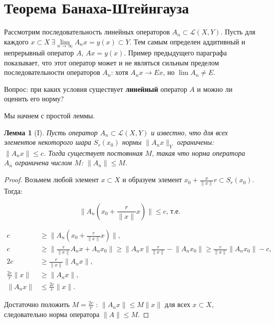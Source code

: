 \documentclass[12pt,a4paper,titlepage,oneside]{book}
\theoremstyle{definition}
\theoremstyle{plain}
\theoremstyle{break}
\theoremstyle{remark}
\theoremstyle{remark}
\theoremstyle{remark}
\theoremstyle{remark}
\theoremstyle{plain}
\newtheorem*{lemma}{Лемма}
\theoremstyle{plain}
\begin{document}
\section{Теорема Банаха-Штейнгауза}
Рассмотрим последовательность линейных операторов $A_n \subset \mathcal{L}(X,Y)$. Пусть для каждого $x \subset X\ \exists \lim\limits_{n\to \infty}A_n x = y(x) \subset Y$. Тем самым определен аддитивный и непрерывный оператор $A$, $Ax = y(x)$. Пример предыдущего параграфа показывает, что этот оператор может и не являться сильным пределом последовательности операторов $A_n$: хотя $A_n x \to E x$, но $\lim A_n \ne E$.

Вопрос: при каких условия существует \textbf{линейный} оператор $A$ и можно ли оценить его норму?

Мы начнем с простой леммы.

\begin{lemma}[I]
Пусть оператор $A_n \subset \mathcal{L}(X,Y)$ и известно, что для всех элементов некоторого шара $S_r(x_0)$ нормы $\lVert A_n x\rVert_Y$ ограничены: $\lVert A_n x\rVert \leqslant c$. Тогда существует постоянная $M$, такая что норма оператора $A_n$ ограничена числом $M$: $\lVert A_n \rVert \leqslant M$.
\end{lemma}

\begin{proof}
Возьмем любой элемент $x \subset X$ и образуем элемент $x_0+\frac{x}{\lVert x\rVert}r \subset S_r(x_0)$. Тогда:

$$\lVert A_n(x_0+\frac{r}{\lVert x \rVert}x) \rVert \leqslant c \mbox{, т.е.}$$

\begin{align*}
c &\geqslant \lVert A_n(x_0+\frac{r}{\lVert x \rVert}x) \rVert,\\
c &\geqslant \lVert \frac{r}{\lVert x \rVert}A_n x + A_n x_0 \rVert \geqslant \lVert A_n x \rVert \frac{r}{\lVert x\rVert} - \lVert A_n x_0 \rVert \geqslant \frac{r}{\lVert x \rVert}\lVert A_n x_0 \rVert - c,\\
2c &\geqslant \frac{r}{\lVert x \rVert}\lVert A_n x\rVert,\\
\frac{2c}{r}\lVert x \rVert &\geqslant \lVert A_n x\rVert,\\
\lVert A_n x \rVert &\leqslant \frac{2c}{r}\lVert x \rVert.
\end{align*}

Достаточно положить $M=\frac{2c}{r}$ : $\lVert A_n x\rVert \leqslant M\lVert x\rVert$ для всех $x \subset X$, следовательно норма оператора $\lVert A\rVert \leqslant M$.
\end{proof}
\end{document}
